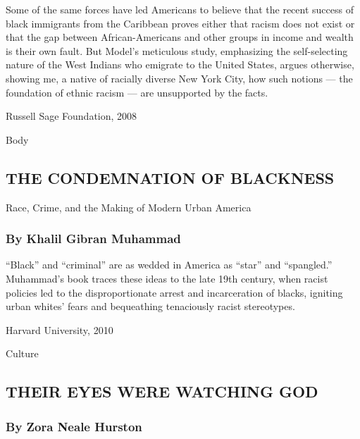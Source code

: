 Some of the same forces have led Americans to believe that the recent
success of black immigrants from the Caribbean proves either that racism
does not exist or that the gap between African-Americans and other
groups in income and wealth is their own fault. But Model's meticulous
study, emphasizing the self-selecting nature of the West Indians who
emigrate to the United States, argues otherwise, showing me, a native of
racially diverse New York City, how such notions --- the foundation of
ethnic racism --- are unsupported by the facts.

Russell Sage Foundation, 2008

Body

\hypertarget{the-condemnation-of-blackness}{%
\subsection{THE CONDEMNATION OF
BLACKNESS}\label{the-condemnation-of-blackness}}

Race, Crime, and the Making of Modern Urban America

\hypertarget{by-khalil-gibran-muhammad}{%
\subsubsection{\texorpdfstring{\textbf{By Khalil Gibran
Muhammad}}{By Khalil Gibran Muhammad}}\label{by-khalil-gibran-muhammad}}

``Black'' and ``criminal'' are as wedded in America as ``star'' and
``spangled.'' Muhammad's book traces these ideas to the late 19th
century, when racist policies led to the disproportionate arrest and
incarceration of blacks, igniting urban whites' fears and bequeathing
tenaciously racist stereotypes.

Harvard University, 2010

Culture

\hypertarget{their-eyes-were-watching-god}{%
\subsection{THEIR EYES WERE WATCHING
GOD}\label{their-eyes-were-watching-god}}

\hypertarget{by-zora-neale-hurston}{%
\subsubsection{\texorpdfstring{\textbf{By Zora Neale
Hurston}}{By Zora Neale Hurston}}\label{by-zora-neale-hurston}}

